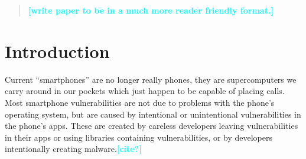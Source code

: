 \documentclass[journal,transmag]{IEEEtran}
\newcommand{\todo}[1]{\textcolor{cyan}{\textbf{[#1]}}}
\newcommand{\dan}[1]{\textcolor{blue}{{\it [Dan says: #1]}}}
\begin{document}
\begin{abstract}









\todo{write paper to be in a much more reader friendly format.} %


\end{abstract}

\section{Introduction}




Current ``smartphones'' are no longer really phones, they are supercomputers we carry around in our pockets which just happen to be capable of placing calls. Most smartphone vulnerabilities are not due to problems with the phone's operating system, but are caused by intentional or unintentional vulnerabilities in the phone's apps. These are created by careless developers leaving vulnerabilities in their apps or using libraries containing vulnerabilities, or by developers intentionally creating malware.\todo{cite?}
\end{document}
